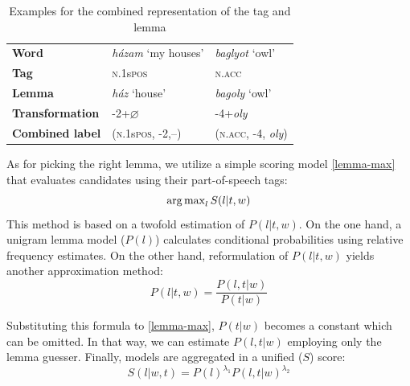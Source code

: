 \begin{table}[H]
\centering
\caption{Examples for the combined representation of the tag and lemma}
\label{tab:lemma-example}
\begin{tabular}{l | l l}
   \textbf{Word} &  \emph{házam} `my houses’ &  \emph{baglyot} `owl’ \\
   \textbf{Tag} &  \textsc{n.1}s\textsc{pos} &  \textsc{n.acc} \\
   \textbf{Lemma} &  \emph{ház} `house’ &  \emph{bagoly} `owl’ \\
   \textbf{Transformation} & -2+$\varnothing$ &  -4+\emph{oly} \\
   \textbf{Combined label} & (\textsc{n.1}s\textsc{pos}, -2,--) &  (\textsc{n.acc}, -4, \emph{oly}) \\
\end{tabular}
\end{table}


As for picking the right lemma, we utilize a simple scoring model \eqref{lemma-max} that evaluates candidates using their part-of-speech tags:
\begin{equation}\label{lemma-max}
\operatorname{arg\,max}_l S(l|t,w)
\end{equation}
This method is based on a twofold estimation of $P(l|t,w)$. On the one hand, a unigram lemma model ($P(l)$) calculates conditional probabilities using relative frequency estimates. 
On the other hand, reformulation of $P(l|t,w)$ yields another approximation method:
\begin{equation}\label{lemma-guesser}
P(l|t,w) = \frac{P(l,t|w)}{P(t|w)}
\end{equation}

Substituting this formula to \eqref{lemma-max}, $P(t|w)$ becomes a constant which can be omitted. 
In that way, we can estimate $P(l,t|w)$ employing only the lemma guesser. 
Finally, models are aggregated in a unified ($S$) score: 
\begin{equation}\label{lemma-interpolated}
S(l|w,t) = P(l)^{\lambda_1} P(l,t|w)^{\lambda_2}
\end{equation}


